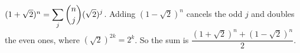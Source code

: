 $(1+\sqrt2)^n=\displaystyle\sum_j\dbinom nj(\sqrt2)^j$. Adding $(1-\sqrt2)^n$ cancels the odd $j$ and doubles the even ones, where $(\sqrt2)^{2k}=2^k$. So the sum is $\boxed{\dfrac{(1+\sqrt2)^n+(1-\sqrt2)^n}2}$.
